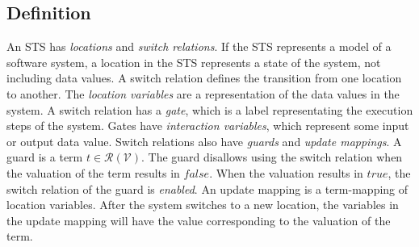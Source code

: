 \subsection{Definition}\label{sec:sts_definition}
An STS has \textit{locations} and \textit{switch relations}. If the STS represents a model of a software system, a location in the STS represents a state of the system, not including data values. A switch relation defines the transition from one location to another. The \textit{location variables} are a representation of the data values in the system. A switch relation has a \textit{gate}, which is a label representating the execution steps of the system. Gates have \textit{interaction variables}, which represent some input or output data value. Switch relations also have \textit{guards} and \textit{update mappings}. A guard is a term $t \in \mathcal{R}(\mathcal{V})$. The guard disallows using the switch relation when the valuation of the term results in $\mathit{false}$. When the valuation results in $\mathit{true}$, the switch relation of the guard is \textit{enabled}. An update mapping is a term-mapping of location variables. After the system switches to a new location, the variables in the update mapping will have the value corresponding to the valuation of the term.
\vspace{5px}
